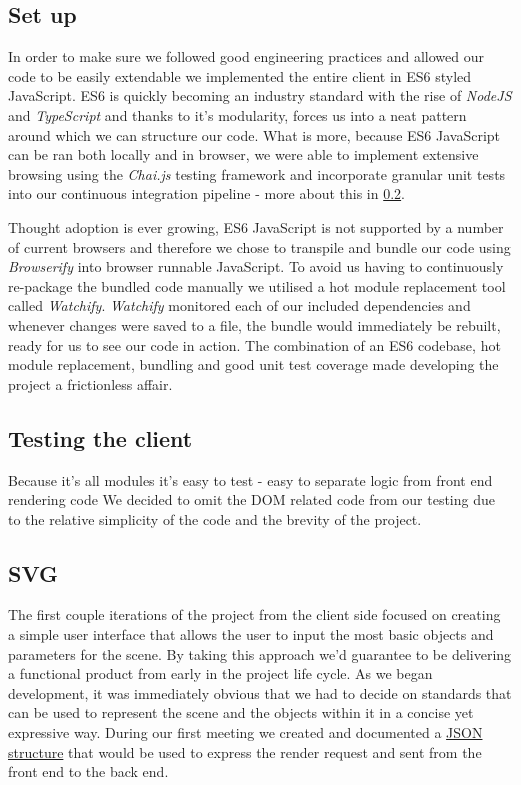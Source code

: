 \documentclass[a4paper]{report}
\begin{document}
	\subsection{Set up}
	In order to make sure we followed good engineering practices and allowed our code to be easily extendable we implemented the entire client in ES6 styled JavaScript. ES6 is quickly becoming an industry standard with the rise of \textit{NodeJS} and \textit{TypeScript} and thanks to it's modularity, forces us into a neat pattern around which we can structure our code. What is more, because ES6 JavaScript can be ran both locally and in browser, we were able to implement extensive browsing using the \textit{Chai.js} testing framework and incorporate granular unit tests into our continuous integration pipeline - more about this in \ref{front-end-tests}.
	
	Thought adoption is ever growing, ES6 JavaScript is not supported by a number of current browsers and therefore we chose to transpile and bundle our code using \textit{Browserify} into browser runnable JavaScript. To avoid us having to continuously re-package the bundled code manually we utilised a hot module replacement tool called \textit{Watchify}. \textit{Watchify} monitored each of our included dependencies and whenever changes were saved to a file, the bundle would immediately be rebuilt, ready for us to see our code in action. The combination of an ES6 codebase, hot module replacement, bundling and good unit test coverage made developing the project a frictionless affair.
	
	\subsection{Testing the client} \label{front-end-tests}
	Because it's all modules it's easy to test  - easy to separate logic from front end rendering code
	We decided to omit the DOM related code from our testing due to the relative simplicity of the code and the brevity of the project.
	
	
	\subsection{SVG}
	
	The first couple iterations of the project from the client side focused on creating a simple user interface that allows the user to input the most basic objects and parameters for the scene. By taking this approach we'd guarantee to be delivering a functional product from early in the project life cycle. As we began development, it was immediately obvious that we had to decide on standards that can be used to represent the scene and the objects within it in a concise yet expressive way. During our first meeting we created and documented a  \hyperlink{https://github.com/davidbenicek/raytracer/wiki/Initial-JSON-payload-design}{JSON structure} that would be used to express the render request and sent from the front end to the back end.
	
\end{document}
